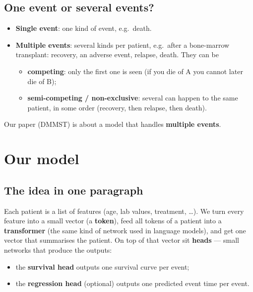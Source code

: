 \documentclass[11pt]{article}
\begin{document}
\subsection{One event or several events?}
\begin{itemize}
  \item \textbf{Single event}: one kind of event, e.g.\ death.
  \item \textbf{Multiple events}: several kinds per patient, e.g.\ after a bone-marrow transplant:
        recovery, an adverse event, relapse, death. They can be
        \begin{itemize}
          \item \textbf{competing}: only the first one is seen (if you die of A you cannot later die of B);
          \item \textbf{semi-competing / non-exclusive}: several can happen to the same patient, in some
                order (recovery, then relapse, then death).
        \end{itemize}
\end{itemize}
Our paper (DMMST) is about a model that handles \textbf{multiple events}.

\section{Our model}

\subsection{The idea in one paragraph}
Each patient is a list of features (age, lab values, treatment, \dots). We turn every feature into a
small vector (a \textbf{token}), feed all tokens of a patient into a \textbf{transformer} (the same
kind of network used in language models), and get one vector that summarises the patient. On top of
that vector sit \textbf{heads} --- small networks that produce the outputs:
\begin{itemize}
  \item the \textbf{survival head} outputs one survival curve per event;
  \item the \textbf{regression head} (optional) outputs one predicted event time per event.
\end{itemize}
\end{document}
